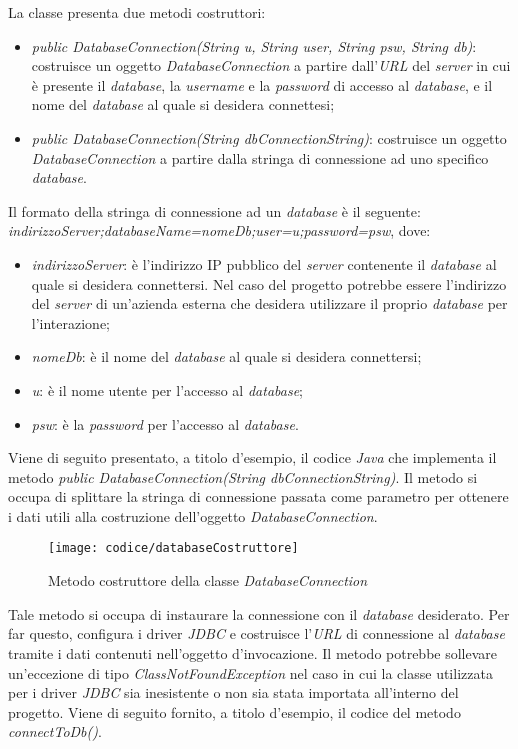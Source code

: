 La classe presenta due metodi costruttori:
\begin{itemize}
	\item \textit{public DatabaseConnection(String u, String user, String psw, String db)}: costruisce un oggetto \textit{DatabaseConnection} a partire dall'\textit{URL} del \textit{server} in cui è presente il \textit{database}, la \textit{username} e la \textit{password} di accesso al \textit{database}, e il nome del \textit{database} al quale si desidera connettesi;
	\item \textit{public DatabaseConnection(String dbConnectionString)}: costruisce un oggetto \textit{DatabaseConnection} a partire dalla stringa di connessione ad uno specifico \textit{database}.
\end{itemize}
Il formato della stringa di connessione ad un \textit{database} è il seguente: \textit{indirizzoServer;databaseName=nomeDb;user=u;password=psw}, dove:
\begin{itemize}
	\item \textit{indirizzoServer}: è l'indirizzo IP pubblico del \textit{server} contenente il \textit{database} al quale si desidera connettersi. Nel caso del progetto potrebbe essere l'indirizzo del \textit{server} di un'azienda esterna che desidera utilizzare il proprio \textit{database} per l'interazione;
	\item \textit{nomeDb}: è il nome del \textit{database} al quale si desidera connettersi;
	\item \textit{u}: è il nome utente per l'accesso al \textit{database};
	\item \textit{psw}: è la \textit{password} per l'accesso al \textit{database}.
\end{itemize}
Viene di seguito presentato, a titolo d'esempio, il codice \textit{Java} che implementa il metodo \textit{public DatabaseConnection(String dbConnectionString)}. Il metodo si occupa di splittare la stringa di connessione passata come parametro per ottenere i dati utili alla costruzione dell'oggetto \textit{DatabaseConnection}.

\begin{figure}[!h] 
    \centering 
    \texttt{[image: codice/databaseCostruttore]} 
    \caption{Metodo costruttore della classe \textit{DatabaseConnection}}
\end{figure}


Tale metodo si occupa di instaurare la connessione con il \textit{database} desiderato. Per far questo, configura i driver \textit{JDBC} e costruisce l'\textit{URL} di connessione al \textit{database} tramite i dati contenuti nell'oggetto d'invocazione. Il metodo potrebbe sollevare un'eccezione di tipo \textit{ClassNotFoundException} nel caso in cui la classe utilizzata per i driver \textit{JDBC} sia inesistente o non sia stata importata all'interno del progetto. Viene di seguito fornito, a titolo d'esempio, il codice del metodo \textit{connectToDb()}.

